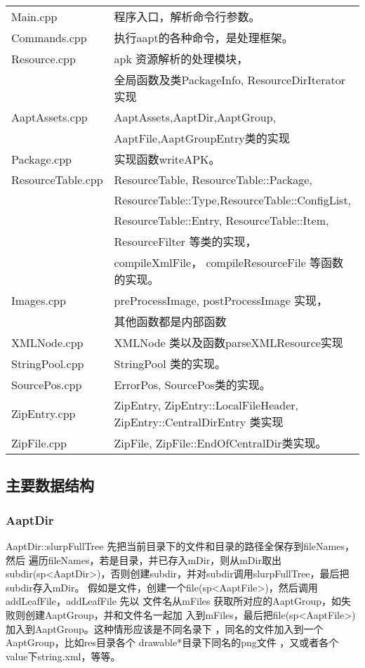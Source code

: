 \documentclass[a4paper,11pt]{article}
\begin{document}
\begin{tabular}{ll}
Main.cpp & 程序入口，解析命令行参数。\\
Commands.cpp & 执行aapt的各种命令，是处理框架。\\
Resource.cpp & apk 资源解析的处理模块，\\
    &全局函数及类PackageInfo, ResourceDirIterator实现\\
AaptAssets.cpp & AaptAssets,AaptDir,AaptGroup,\\
    &AaptFile,AaptGroupEntry类的实现\\
Package.cpp &  实现函数writeAPK。 \\
ResourceTable.cpp & ResourceTable, ResourceTable::Package,\\
    &ResourceTable::Type,ResourceTable::ConfigList,\\ 
    &ResourceTable::Entry, ResourceTable::Item,\\
    &ResourceFilter 等类的实现，\\
    &compileXmlFile， compileResourceFile 等函数的实现。\\
Images.cpp & preProcessImage, postProcessImage 实现，\\
&其他函数都是内部函数\\
XMLNode.cpp & XMLNode 类以及函数parseXMLResource实现\\
StringPool.cpp & StringPool 类的实现。\\
SourcePos.cpp & ErrorPos, SourcePos类的实现。\\
ZipEntry.cpp & ZipEntry, ZipEntry::LocalFileHeader, ZipEntry::CentralDirEntry
类实现\\
ZipFile.cpp & ZipFile, ZipFile::EndOfCentralDir类实现。\\
\end{tabular}

\subsection{主要数据结构}
\subsubsection{AaptDir}
AaptDir::slurpFullTree 先把当前目录下的文件和目录的路径全保存到fileNames，然后
遍历fileNames，若是目录，并已存入mDir，则从mDir取出
subdir(sp<AaptDir>)，否则创建subdir，并对subdir调用slurpFullTree，最后把subdir存入mDir。
假如是文件，创建一个file(sp<AaptFile>)，然后调用addLeafFile，addLeafFile 先以
文件名从mFiles 获取所对应的AaptGroup，如失败则创建AaptGroup，并和文件名一起加
入到mFiles，最后把file(sp<AaptFile>)加入到AaptGroup。这种情形应该是不同名录下
，同名的文件加入到一个AaptGroup，比如res目录各个 drawable*目录下同名的png文件
，又或者各个value下string.xml，等等。
\end{document}
